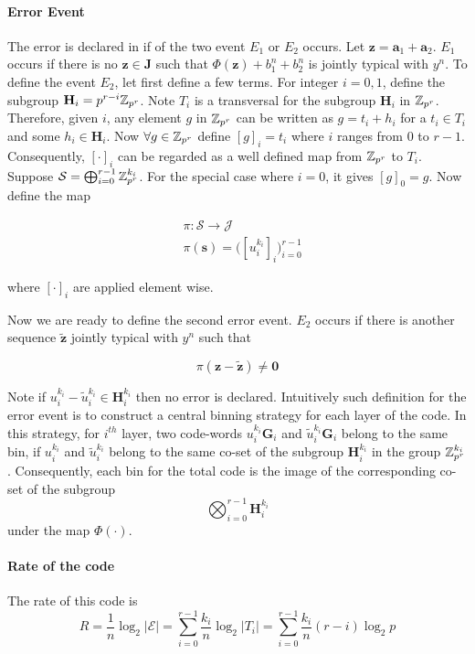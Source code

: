 \documentclass[conference]{IEEEtran}
\theoremstyle{plain}
\theoremstyle{definition}
\theoremstyle{remark}
\begin{document}
\paragraph*{Error Event}
 The error is declared in if of the two event $E_1$ or $E_2$ occurs.  Let $\mathbf{z}=\mathbf{a}_1+\mathbf{a}_2$. $E_1$ occurs if there is no $\mathbf{z} \in \mathbf{J}$ such that $\Phi(\mathbf{z})+b_1^n+b_2^n$ is jointly typical with $y^n$. To define the event $E_2$, let first define a few terms. For integer $i=0,1$, define the subgroup $\mathbf{H}_i=p^{r-i} \mathbb{Z}_{p^r}$. Note $T_i$ is a transversal for the subgroup $\mathbf{H}_i$ in $\mathbb{Z}_{p^r}$. Therefore, given $i$, any element $g$ in $\mathbb{Z}_{p^r}$ can be written as $g=t_i+h_i$ for a $t_i \in T_i$ and some $h_i \in \mathbf{H}_i$. Now $\forall g \in \mathbb{Z}_{p^r}$ define $[g]_i=t_i$ where $i$ ranges from $0$ to $r-1$. Consequently, $[\cdot]_i$ can be regarded as a well defined map from $\mathbb{Z}_{p^r}$ to $T_i$. Suppose $\mathcal{S}=\bigoplus_{i=0}^{r-1} \mathbb{Z}_{p^r}^{k_i}$. For the special case where $i=0$, it gives $[g]_0=g$. Now define the map 

\begin{align*}
&\pi : \mathcal{S} \rightarrow \mathcal{J}\\
&\pi(\mathbf{s})=\big ( [u_i^{k_i}]_i \big )_{i=0}^{r-1}
\end{align*}

where $[\cdot ]_i$ are applied element wise.

Now we are ready to define the second error event. $E_2$ occurs if there is another sequence $\tilde{\mathbf{z}}$ jointly typical with $y^n$ such that

\begin{equation*}
\pi(\mathbf{z}-\tilde{\mathbf{z}}) \neq \mathbf{0}
\end{equation*}

Note if $u_i^{k_i}-\tilde{u}_i^{k_i} \in \mathbf{H}_i^{k_i}$ then no error is declared. Intuitively such definition for the error event is to construct a central binning strategy for each layer of the code. In this strategy, for $i^{th}$ layer, two code-words $u_i^{k_i}\mathbf{G}_i$ and $\tilde{u}_i^{k_i}\mathbf{G}_i$ belong to the same bin, if $u_i^{k_i}$ and  $\tilde{u}_i^{k_i}$ belong to the same co-set of the subgroup $\mathbf{H}^{k_i}_i$ in the group $\mathbb{Z}^{k_i}_{p^r}$. Consequently, each bin for the total code is the image of the corresponding co-set of the subgroup $$\bigotimes_{i=0}^{r-1} \mathbf{H}_i^{k_i}$$ under the map $\Phi(\cdot)$.

\paragraph*{Rate of the code}
The rate of this code is  
\begin{equation}
R=\frac{1}{n} \log_2 |\mathcal{E}|= \sum_{i=0}^{r-1} \frac{k_i}{n} \log_2 |T_i| = \sum_{i=0}^{r-1} \frac{k_i}{n} (r-i) \log_2 p
\end{equation}
\end{document}
